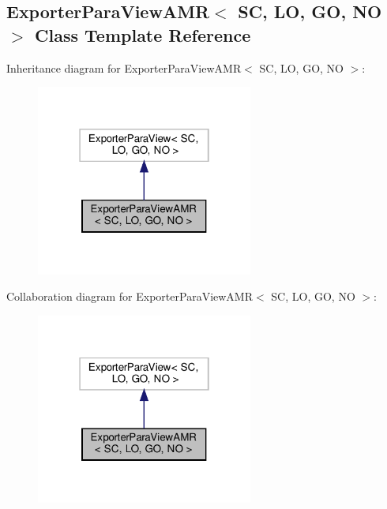 \hypertarget{classFEDD_1_1ExporterParaViewAMR}{}\subsection{Exporter\+Para\+View\+A\+MR$<$ SC, LO, GO, NO $>$ Class Template Reference}
\label{classFEDD_1_1ExporterParaViewAMR}


Inheritance diagram for Exporter\+Para\+View\+A\+MR$<$ SC, LO, GO, NO $>$\+:\nopagebreak
\begin{figure}[H]
\begin{center}
\leavevmode
\includegraphics[width=202pt]{classFEDD_1_1ExporterParaViewAMR__inherit__graph}
\end{center}
\end{figure}


Collaboration diagram for Exporter\+Para\+View\+A\+MR$<$ SC, LO, GO, NO $>$\+:\nopagebreak
\begin{figure}[H]
\begin{center}
\leavevmode
\includegraphics[width=202pt]{classFEDD_1_1ExporterParaViewAMR__coll__graph}
\end{center}
\end{figure}
